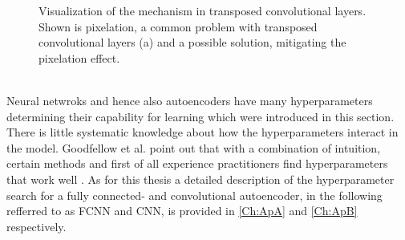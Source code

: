 \begin{figure}[htbp!]
	\begin{subfigure}{.435\textwidth}
		\centering
		
		\label{Fig: Upsampling(a)}
	\end{subfigure}\hfill
	\begin{subfigure}{.455\textwidth}
		\centering
		
		\label{Fig: Upsampling(b)}
	\end{subfigure}
	\caption{Visualization of the mechanism in transposed convolutional layers. Shown is pixelation, a common problem with transposed convolutional layers (a) and a possible solution, mitigating the pixelation effect.}
	\label{Fig: Upsampling}
\end{figure}\\
Neural netwroks and hence also autoencoders have many hyperparameters determining their capability for learning which were introduced in this section. There is little systematic knowledge about how the hyperparameters interact in the model. Goodfellow et al. point out that with a combination of intuition, certain methods and first of all experience practitioners find hyperparameters that work well \cite{Goodfellow}. As for this thesis a detailed description of the hyperparameter search for a fully connected- and convolutional autoencoder, in the following refferred to as FCNN and CNN, is provided in \cref{Ch:ApA} and \cref{Ch:ApB} respectively.